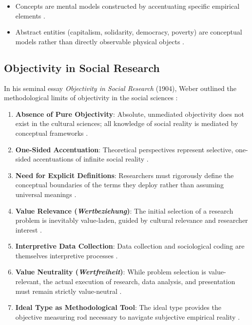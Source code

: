 \begin{QuickRevision}
\begin{itemize}
    \item Concepts are mental models constructed by accentuating specific empirical elements .
    \item Abstract entities (capitalism, solidarity, democracy, poverty) are conceptual models rather than directly observable physical objects .
\end{itemize}
\end{QuickRevision}

\subsection{Objectivity in Social Research}

In his seminal essay \textit{Objectivity in Social Research} (1904), Weber outlined the methodological limits of objectivity in the social sciences :

\begin{enumerate}
    \item \textbf{Absence of Pure Objectivity}: Absolute, unmediated objectivity does not exist in the cultural sciences; all knowledge of social reality is mediated by conceptual frameworks .
    \item \textbf{One-Sided Accentuation}: Theoretical perspectives represent selective, one-sided accentuations of infinite social reality .
    \item \textbf{Need for Explicit Definitions}: Researchers must rigorously define the conceptual boundaries of the terms they deploy rather than assuming universal meanings .
    \item \textbf{Value Relevance (\textit{Wertbeziehung})}: The initial selection of a research problem is inevitably value-laden, guided by cultural relevance and researcher interest .
    \item \textbf{Interpretive Data Collection}: Data collection and sociological coding are themselves interpretive processes .
    \item \textbf{Value Neutrality (\textit{Wertfreiheit})}: While problem selection is value-relevant, the actual execution of research, data analysis, and presentation must remain strictly value-neutral .
    \item \textbf{Ideal Type as Methodological Tool}: The ideal type provides the objective measuring rod necessary to navigate subjective empirical reality .
\end{enumerate}

